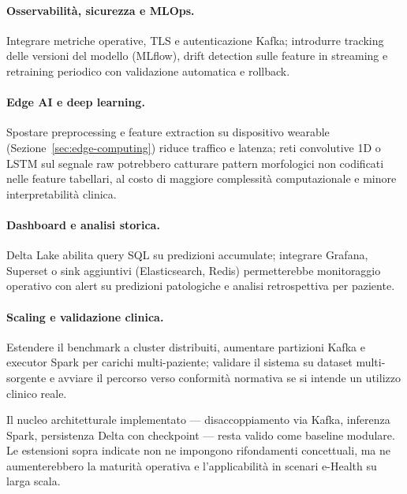 \paragraph{Osservabilità, sicurezza e MLOps.}
Integrare metriche operative, TLS e autenticazione Kafka; introdurre tracking delle versioni del modello (MLflow), drift detection sulle feature in streaming e retraining periodico con validazione automatica e rollback.

\paragraph{Edge AI e deep learning.}
Spostare preprocessing e feature extraction su dispositivo wearable (Sezione~\ref{sec:edge-computing}) riduce traffico e latenza; reti convolutive 1D o LSTM sul segnale raw potrebbero catturare pattern morfologici non codificati nelle feature tabellari, al costo di maggiore complessità computazionale e minore interpretabilità clinica.

\paragraph{Dashboard e analisi storica.}
Delta Lake abilita query SQL su predizioni accumulate; integrare Grafana, Superset o sink aggiuntivi (Elasticsearch, Redis) permetterebbe monitoraggio operativo con alert su predizioni patologiche e analisi retrospettiva per paziente.

\paragraph{Scaling e validazione clinica.}
Estendere il benchmark a cluster distribuiti, aumentare partizioni Kafka e executor Spark per carichi multi-paziente; validare il sistema su dataset multi-sorgente e avviare il percorso verso conformità normativa se si intende un utilizzo clinico reale.

Il nucleo architetturale implementato --- disaccoppiamento via Kafka, inferenza Spark, persistenza Delta con checkpoint --- resta valido come baseline modulare.
Le estensioni sopra indicate non ne impongono rifondamenti concettuali, ma ne aumenterebbero la maturità operativa e l'applicabilità in scenari e-Health su larga scala.
